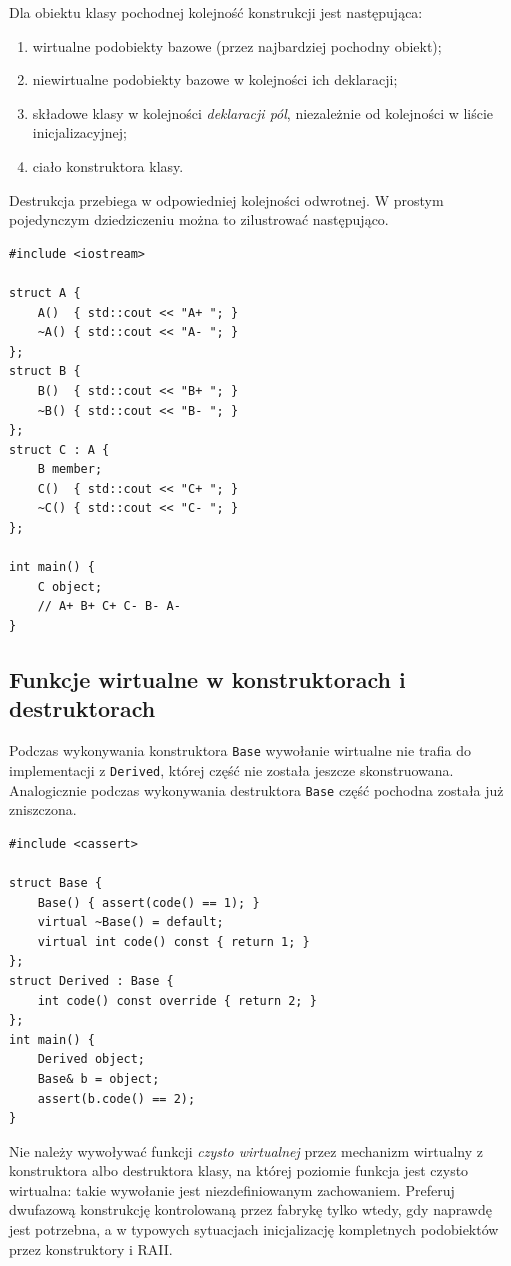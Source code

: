 Dla obiektu klasy pochodnej kolejność konstrukcji jest następująca:
\begin{enumerate}
\item wirtualne podobiekty bazowe (przez najbardziej pochodny obiekt);
\item niewirtualne podobiekty bazowe w kolejności ich deklaracji;
\item składowe klasy w kolejności \emph{deklaracji pól}, niezależnie od
      kolejności w liście inicjalizacyjnej;
\item ciało konstruktora klasy.
\end{enumerate}
Destrukcja przebiega w odpowiedniej kolejności odwrotnej.
W prostym pojedynczym dziedziczeniu można to zilustrować następująco.

\begin{lstlisting}[caption={Kolejność konstruowania podobiektów (C++11); kompletny program.}]
#include <iostream>

struct A {
    A()  { std::cout << "A+ "; }
    ~A() { std::cout << "A- "; }
};
struct B {
    B()  { std::cout << "B+ "; }
    ~B() { std::cout << "B- "; }
};
struct C : A {
    B member;
    C()  { std::cout << "C+ "; }
    ~C() { std::cout << "C- "; }
};

int main() {
    C object;
    // A+ B+ C+ C- B- A-
}
\end{lstlisting}

\subsection{Funkcje wirtualne w konstruktorach i destruktorach}

Podczas wykonywania konstruktora \texttt{Base} wywołanie wirtualne
nie trafia do implementacji z \texttt{Derived}, której część nie
została jeszcze skonstruowana. Analogicznie podczas wykonywania
destruktora \texttt{Base} część pochodna została już zniszczona.

\begin{lstlisting}[caption={Dynamiczne wiązanie podczas konstrukcji (C++11); kompletny program.}]
#include <cassert>

struct Base {
    Base() { assert(code() == 1); }
    virtual ~Base() = default;
    virtual int code() const { return 1; }
};
struct Derived : Base {
    int code() const override { return 2; }
};
int main() {
    Derived object;
    Base& b = object;
    assert(b.code() == 2);
}
\end{lstlisting}

\noindent Nie należy wywoływać funkcji \emph{czysto wirtualnej}
przez mechanizm wirtualny z konstruktora albo destruktora klasy,
na której poziomie funkcja jest czysto wirtualna: takie wywołanie
jest niezdefiniowanym zachowaniem. Preferuj dwufazową konstrukcję
kontrolowaną przez fabrykę tylko wtedy, gdy naprawdę jest potrzebna,
a w typowych sytuacjach inicjalizację kompletnych podobiektów
przez konstruktory i RAII.

